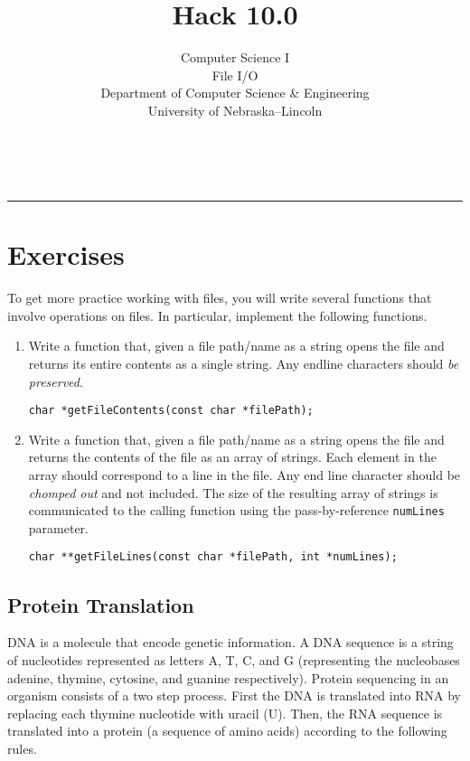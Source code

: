 \documentclass[12pt]{scrartcl}
\title{Hack 10.0}\let\Title\@title
\subtitle{Computer Science I\\
File I/O\\
{\small
\vskip1cm
Department of Computer Science \& Engineering \\
University of Nebraska--Lincoln}
\vskip-2cm}
\date{~}
\begin{document}
\maketitle

\hrule



\section*{Exercises}

To get more practice working with files, you will write several 
functions that involve operations on files.  In particular, implement
the following functions.

\begin{enumerate}

  \item Write a function that, given a file path/name as a string opens
  the file and returns its entire contents as a single string.  Any endline
  characters should \emph{be preserved}.
  
  \texttt{char *getFileContents(const char *filePath);}

  \item Write a function that, given a file path/name as a string opens
  the file and returns the contents of the file as an array of strings.
  Each element in the array should correspond to a line in the file.
  Any end line character should be \emph{chomped out} and not included.
  The size of the resulting array of strings is communicated to the calling
  function using the pass-by-reference \texttt{numLines} parameter.

  \texttt{char **getFileLines(const char *filePath, int *numLines);}

\end{enumerate}

\subsection*{Protein Translation}

DNA is a molecule that encode genetic information.  A DNA sequence is 
a string of nucleotides represented as letters A, T, C, and G (representing
the nucleobases adenine, thymine, cytosine, and guanine respectively).  
Protein sequencing in an organism consists of a two step process.  First 
the DNA is translated into RNA by replacing each thymine nucleotide with 
uracil (U).  Then, the RNA sequence is translated into a protein (a sequence
of amino acids) according to the following rules.
\end{document}
